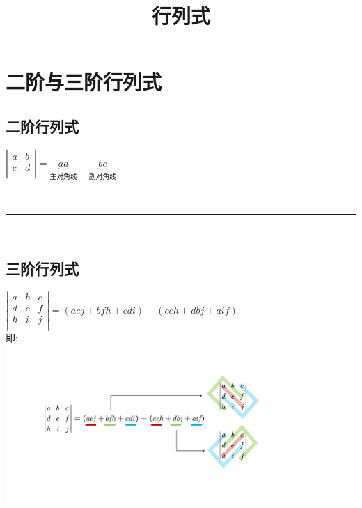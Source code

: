 \documentclass[UTF8]{ctexart}
\title{行列式}
\begin{document}
	\tableofcontents %
	\date{} %
	\maketitle  %
	
	
	
	
	\section{二阶与三阶行列式}
	
	\subsection{二阶行列式}
	
	$
	\left| \begin{matrix}
		a&		b\\
		c&		d\\
	\end{matrix} \right|=\underset{\text{主对角线}}{\underbrace{ad}}-\underset{\text{副对角线}}{\underbrace{bc}}
	$
	

~\\
\hrule
~\\

	
		\subsection{三阶行列式}
	$
	\left| \begin{matrix}
		a&		b&		c\\
		d&		e&		f\\
		h&		i&		j\\
	\end{matrix} \right|=\left( aej+bfh+cdi \right) -\left( ceh+dbj+aif \right) 
	$ \\
	
	即: \\
	\includegraphics[width=0.8\textwidth]{img/0001.pdf}
	
\end{document}
